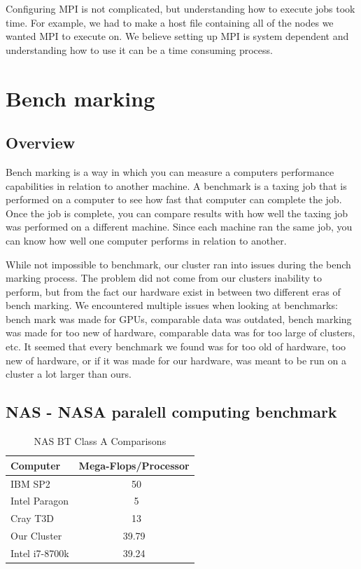 \documentclass[12pt]{article}
\begin{document}
Configuring MPI is not complicated, but understanding how to execute jobs took time. For example, we had to make a host file containing all of the nodes we wanted MPI to execute on. We believe setting up MPI is system dependent and understanding how to use it can be a time consuming process.

%
%
\section{Bench marking}

\subsection{Overview}

Bench marking is a way in which you can measure a computers performance capabilities in relation to another machine. A benchmark is a taxing job that is performed on a computer to see how fast that computer can complete the job. Once the job is complete, you can compare results with how well the taxing job was performed on a different machine. Since each machine ran the same job, you can know how well one computer performs in relation to another.

While not impossible to benchmark, our cluster ran into issues during the bench marking process. The problem did not come from our clusters inability to perform, but from the fact our hardware exist in between two different eras of bench marking. We encountered multiple issues when looking at benchmarks: bench mark was made for GPUs, comparable data was outdated, bench marking was made for too new of hardware, comparable data was for too large of clusters, etc. It seemed that every benchmark we found was for too old of hardware, too new of hardware, or if it was made for our hardware, was meant to be run on a cluster a lot larger than ours. 

\subsection{NAS - NASA paralell computing benchmark}

\begin{table}[ht!]
    \centering
    \begin{tabular}{lc}
        Computer & Mega-Flops/Processor\\
        \hline
        IBM SP2 & ~50 \\
        Intel Paragon & ~5\\
        Cray T3D & ~13\\
        Our Cluster & 39.79\\
        Intel i7-8700k & 39.24\\
    \end{tabular}
    \caption{NAS BT Class A Comparisons}
    \label{tab:flops}
\end{table}
\end{document}
